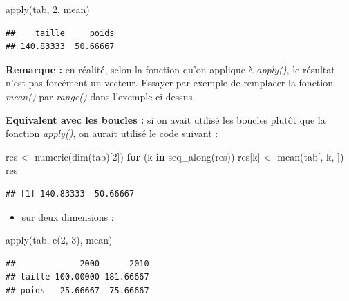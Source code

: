 \documentclass[
]{book}
\newenvironment{Shaded}{\begin{snugshade}}{\end{snugshade}}
\newcommand{\ControlFlowTok}[1]{\textcolor[rgb]{0.13,0.29,0.53}{\textbf{#1}}}
\newcommand{\DecValTok}[1]{\textcolor[rgb]{0.00,0.00,0.81}{#1}}
\newcommand{\FunctionTok}[1]{\textcolor[rgb]{0.00,0.00,0.00}{#1}}
\newcommand{\NormalTok}[1]{#1}
\newcommand{\OtherTok}[1]{\textcolor[rgb]{0.56,0.35,0.01}{#1}}
\providecommand{\tightlist}{%
  \setlength{\itemsep}{0pt}\setlength{\parskip}{0pt}}
\theoremstyle{definition}
\theoremstyle{definition}
\theoremstyle{definition}
\theoremstyle{definition}
\theoremstyle{remark}
\begin{document}
\begin{Shaded}
\begin{Highlighting}[]
\FunctionTok{apply}\NormalTok{(tab, }\DecValTok{2}\NormalTok{, mean)}
\end{Highlighting}
\end{Shaded}

\begin{verbatim}
##    taille     poids 
## 140.83333  50.66667
\end{verbatim}

\textbf{Remarque :} en réalité, selon la fonction qu'on applique à \emph{apply()}, le résultat n'est pas forcément un vecteur. Essayer par exemple de remplacer la fonction \emph{mean()} par \emph{range()} dans l'exemple ci-dessus.

\textbf{Equivalent avec les boucles :} si on avait utilisé les boucles plutôt que la fonction \emph{apply()}, on aurait utilisé le code suivant :

\begin{Shaded}
\begin{Highlighting}[]
\NormalTok{res }\OtherTok{\textless{}{-}} \FunctionTok{numeric}\NormalTok{(}\FunctionTok{dim}\NormalTok{(tab)[}\DecValTok{2}\NormalTok{])}
\ControlFlowTok{for}\NormalTok{ (k }\ControlFlowTok{in} \FunctionTok{seq\_along}\NormalTok{(res))}
\NormalTok{  res[k] }\OtherTok{\textless{}{-}} \FunctionTok{mean}\NormalTok{(tab[, k, ])}
\NormalTok{res}
\end{Highlighting}
\end{Shaded}

\begin{verbatim}
## [1] 140.83333  50.66667
\end{verbatim}

\begin{itemize}
\tightlist
\item
  sur deux dimensions :
\end{itemize}

\begin{Shaded}
\begin{Highlighting}[]
\FunctionTok{apply}\NormalTok{(tab, }\FunctionTok{c}\NormalTok{(}\DecValTok{2}\NormalTok{, }\DecValTok{3}\NormalTok{), mean)}
\end{Highlighting}
\end{Shaded}

\begin{verbatim}
##             2000      2010
## taille 100.00000 181.66667
## poids   25.66667  75.66667
\end{verbatim}
\end{document}

